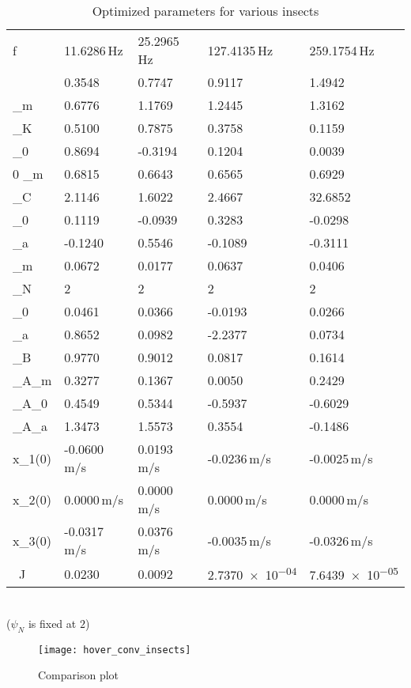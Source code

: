 \documentclass[10pt]{article}
\begin{document}
\begin{table}[h!]
	\caption{Optimized parameters for various insects}\label{tab:hover_insect_params}
	\begin{center}
		\begin{tabular}{|m|m|m|m|m|}
			\hline
			\text{Parameters} & \text{Monarch} & \text{Hawkmoth} & \text{Bumblebee} & \text{Fruitfly}\\\hline
			f & 11.6286\,\si{Hz} & 25.2965\,\si{Hz} & 127.4135\,\si{Hz} & 259.1754\,\si{Hz} \\
			\beta & 0.3548 & 0.7747 & 0.9117 & 1.4942 \\
			\phi_m & 0.6776 & 1.1769 & 1.2445 & 1.3162 \\
			\phi_K & 0.5100 & 0.7875 & 0.3758 & 0.1159 \\
			\phi_0 & 0.8694 & -0.3194 & 0.1204 & 0.0039 \\0
			\theta_m & 0.6815 & 0.6643 & 0.6565 & 0.6929 \\
			\theta_C & 2.1146 & 1.6022 & 2.4667 & 32.6852 \\
			\theta_0 & 0.1119 & -0.0939 & 0.3283 & -0.0298 \\
			\theta_a & -0.1240 & 0.5546 & -0.1089 & -0.3111 \\
			\psi_m & 0.0672 & 0.0177 & 0.0637 & 0.0406 \\
			\psi_N & 2 & 2 & 2 & 2\\
			\psi_0 & 0.0461 & 0.0366 & -0.0193 & 0.0266 \\
			\psi_a & 0.8652 & 0.0982 & -2.2377 & 0.0734 \\
			\theta_B & 0.9770 & 0.9012 & 0.0817 & 0.1614 \\
			\theta_{A_m} & 0.3277 & 0.1367 & 0.0050 & 0.2429 \\
			\theta_{A_0} & 0.4549 & 0.5344 & -0.5937 & -0.6029 \\
			\theta_{A_a} & 1.3473 & 1.5573 & 0.3554 & -0.1486 \\
			\dot x_1(0) & -0.0600\,\si{m/s} & 0.0193\,\si{m/s} & -0.0236\,\si{m/s} & -0.0025\,\si{m/s} \\
			\dot x_2(0) & 0.0000\,\si{m/s} & 0.0000\,\si{m/s} & 0.0000\,\si{m/s} & 0.0000\,\si{m/s} \\
			\dot x_3(0) & -0.0317\,\si{m/s} & 0.0376\,\si{m/s} & -0.0035\,\si{m/s} & -0.0326\,\si{m/s} \\\hline
			\text{Optimized}\ J & 0.0230 & 0.0092 & \num{2.7370e-04} & \num{7.6439e-05} \\\hline
		\end{tabular}\\[0.1cm]
		($ \psi_N $ is fixed at $ 2 $)
	\end{center}
\end{table}
%
\begin{figure}[h!]
	\centering
	\texttt{[image: hover\_conv\_insects]}
	\caption{Comparison plot}
	\label{fig:conv_insects}
\end{figure}
\end{document}
